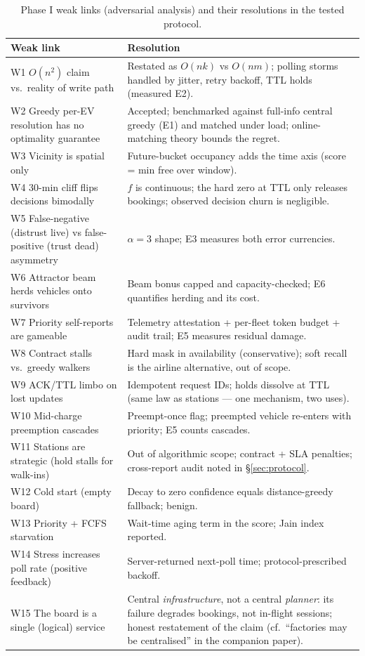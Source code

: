 \documentclass[twoside,twocolumn,usenatbib]{mnras}
\begin{document}
\begin{table}
\centering
\caption{Phase I weak links (adversarial analysis) and their
resolutions in the tested protocol.}
\label{tab:weak}
\begin{tabular}{@{}p{}p{}@{}}
\toprule
Weak link & Resolution \\
\midrule
W1 $O(n^2)$ claim vs.\ reality of write path &
Restated as $O(nk)$ vs $O(nm)$; polling storms handled by jitter,
retry backoff, TTL holds (measured E2). \\
W2 Greedy per-EV resolution has no optimality guarantee &
Accepted; benchmarked against full-info central greedy (E1) and
matched under load; online-matching theory bounds the regret. \\
W3 Vicinity is spatial only &
Future-bucket occupancy adds the time axis (score = min free over
window). \\
W4 30-min cliff flips decisions bimodally &
$f$ is continuous; the hard zero at TTL only releases bookings;
observed decision churn is negligible. \\
W5 False-negative (distrust live) vs false-positive (trust dead)
asymmetry & $\alpha=3$ shape; E3 measures both error currencies. \\
W6 Attractor beam herds vehicles onto survivors &
Beam bonus capped and capacity-checked; E6 quantifies herding and
its cost. \\
W7 Priority self-reports are gameable &
Telemetry attestation + per-fleet token budget + audit trail; E5
measures residual damage. \\
W8 Contract stalls vs.\ greedy walkers &
Hard mask in availability (conservative); soft recall is the
airline alternative, out of scope. \\
W9 ACK/TTL limbo on lost updates &
Idempotent request IDs; holds dissolve at TTL (same law as
stations --- one mechanism, two uses). \\
W10 Mid-charge preemption cascades &
Preempt-once flag; preempted vehicle re-enters with priority; E5
counts cascades. \\
W11 Stations are strategic (hold stalls for walk-ins) &
Out of algorithmic scope; contract + SLA penalties; cross-report
audit noted in \S\ref{sec:protocol}. \\
W12 Cold start (empty board) &
Decay to zero confidence equals distance-greedy fallback; benign. \\
W13 Priority + FCFS starvation &
Wait-time aging term in the score; Jain index reported. \\
W14 Stress increases poll rate (positive feedback) &
Server-returned next-poll time; protocol-prescribed backoff. \\
W15 The board is a single (logical) service &
Central \emph{infrastructure}, not a central \emph{planner}: its
failure degrades bookings, not in-flight sessions; honest
restatement of the claim (cf.\ ``factories may be centralised'' in
the companion paper). \\
\bottomrule
\end{tabular}
\end{table}
\end{document}
